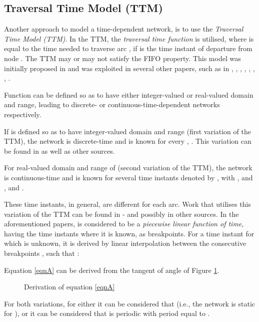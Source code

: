 \documentclass[conference]{IEEEtran}
\begin{document}
\subsection{Traversal Time Model (TTM)} \label{ttm} 

Another approach to model a time-dependent network, is to use the \emph{Traversal Time Model (TTM)}. In the TTM, the \emph{traversal time function}  is utilised, where  is equal to the time needed to traverse arc , if  is the time instant of departure from node . The TTM may or may not satisfy the FIFO property. This model was initially proposed in \cite{Cooke} and was exploited in several other papers, such as in \cite{Delling}, \cite{Nannicini}, \cite{Delling2}, \cite{Delling3}, \cite{Delling4}, \cite{Ding}, \cite{Batz}, \cite{Chabini}. 




Function  can be defined so as to have either integer-valued or real-valued domain and range, leading to discrete- or continuous-time-dependent networks respectively.

If  is defined so as to have integer-valued domain and range (first variation of the TTM), the network is discrete-time and  is known for every , . This variation can be found in \cite{Chabini} as well as other sources.

For real-valued domain and range of  (second variation of the TTM), the network is continuous-time and  is known for several time instants denoted by , with ,  and ,  and .

These time instants, in general, are different for each arc. Work that utilises this variation of the TTM can be found in \cite{Delling}-\cite{Batz} and possibly in other sources. In the aforementioned papers,  is considered to be a \emph{piecewise linear function of time}, having the time instants  where it is known, as breakpoints. For a time instant  for which  is unknown, it is derived by linear interpolation between the consecutive breakpoints ,  such that :



Equation \ref{eqnA} can be derived from the tangent of angle  of Figure \ref{fig2}. 

\begin{figure}
\caption{Derivation of equation \ref{eqnA}} \label{fig2}
\end{figure}

For both variations,  for  either it can be considered that  (i.e., the network is static for ), or it can be considered that  is periodic with period equal to . 
\end{document}

